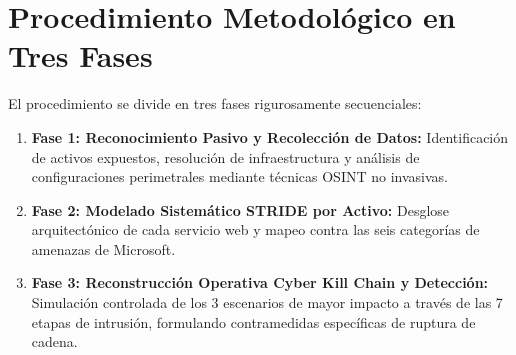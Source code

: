 \section{Procedimiento Metodológico en Tres Fases}
El procedimiento se divide en tres fases rigurosamente secuenciales:
\begin{enumerate}
    \item \textbf{Fase 1: Reconocimiento Pasivo y Recolección de Datos:} Identificación de activos expuestos, resolución de infraestructura y análisis de configuraciones perimetrales mediante técnicas OSINT no invasivas.
    \item \textbf{Fase 2: Modelado Sistemático STRIDE por Activo:} Desglose arquitectónico de cada servicio web y mapeo contra las seis categorías de amenazas de Microsoft.
    \item \textbf{Fase 3: Reconstrucción Operativa Cyber Kill Chain y Detección:} Simulación controlada de los 3 escenarios de mayor impacto a través de las 7 etapas de intrusión, formulando contramedidas específicas de ruptura de cadena.
\end{enumerate}
